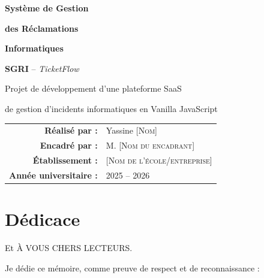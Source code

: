 \documentclass[12pt,a4paper,twoside]{report}
\begin{document}
\begin{titlepage}
    \centering
    \vspace*{4cm}
    
    {\Huge\bfseries\color{darkbg} Système de Gestion\par}
    {\Huge\bfseries\color{primaryblue} des Réclamations\par}
    {\Huge\bfseries\color{darkbg} Informatiques\par}
    
    \vspace{1.5cm}
    
    {\Large\textbf{SGRI} -- \textit{TicketFlow}\par}
    
    \vspace{2cm}
    
    {\large Projet de développement d'une plateforme SaaS\par}
    {\large de gestion d'incidents informatiques en Vanilla JavaScript\par}
    
    \vspace{3cm}
    
    \begin{tabular}{rl}
        \textbf{Réalisé par :} & Yassine \textsc{[Nom]} \\
        \textbf{Encadré par :} & M. \textsc{[Nom du encadrant]} \\
        \textbf{Établissement :} & \textsc{[Nom de l'école/entreprise]} \\
        \textbf{Année universitaire :} & 2025 -- 2026
    \end{tabular}
    
    \vfill
\end{titlepage}

\chapter*{Dédicace}

\vspace*{1cm}

Et À VOUS CHERS LECTEURS.

Je dédie ce mémoire, comme preuve de respect et de reconnaissance :

\vspace{0.5cm}
\end{document}
